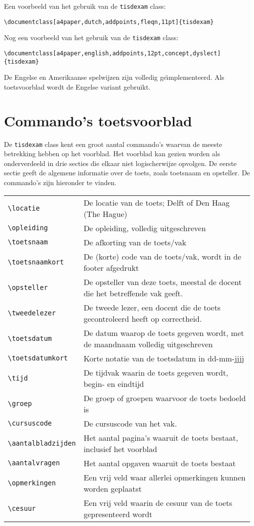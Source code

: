 \documentclass[dutch,a4paper,12pt,addpoints,fleqn,oneside]{tisdexam}
\newcommand\DocClass[1]{\texttt{#1}}
\begin{document}
\bigskip
Een voorbeeld van het gebruik van de \DocClass{tisdexam} class:
\bigskip

\verb|\documentclass[a4paper,dutch,addpoints,fleqn,11pt]{tisdexam}|
\bigskip

Nog een voorbeeld van het gebruik van de \DocClass{tisdexam} class:
\bigskip

\verb|\documentclass[a4paper,english,addpoints,12pt,concept,dyslect]{tisdexam}|
\bigskip

De Engelse en Amerikaanse spelwijzen zijn volledig
ge\"{\i}mplementeerd. Als toetsvoorblad wordt de Engelse variant gebruikt.


\section{Commando's toetsvoorblad}
\label{sec:commands}

De \DocClass{tisdexam} class kent een groot aantal commando's waarvan de meeste
betrekking hebben op het voorblad.  Het voorblad kan gezien worden als onderverdeeld
in drie secties die elkaar niet logischerwijze opvolgen. De eerste sectie geeft de
algemene informatie over de toets, zoals
toetsnaam en opsteller. De commando's zijn hieronder te vinden.
\bigskip

\begin{tabular}{lp{11.9cm}}
\verb|\locatie| & De locatie van de toets; Delft of Den Haag (The Hague) \\
\verb|\opleiding| & De opleiding, volledig uitgeschreven\\ 
\verb|\toetsnaam| & De afkorting van de toets/vak \\
\verb|\toetsnaamkort| & De (korte) code van de toets/vak, wordt in de footer afgedrukt \\ 
\verb|\opsteller| & De opsteller van deze toets, meestal de docent die het betreffende vak geeft. \\
\verb|\tweedelezer| & De tweede lezer, een docent die de toets gecontroleerd heeft op correctheid. \\
\verb|\toetsdatum| & De datum waarop de toets gegeven wordt, met de maandnaam volledig uitgeschreven \\ 
\verb|\toetsdatumkort| & Korte notatie van de toetsdatum in dd-mm-jjjj \\
\verb|\tijd|       & De tijdvak waarin de toets gegeven wordt, begin- en eindtijd \\
\verb|\groep|     & De groep of groepen waarvoor de toets bedoeld is \\ 
\verb|\cursuscode|    & De cursuscode van het vak. \\
\verb|\aantalbladzijden| & Het aantal pagina's waaruit de toets bestaat, inclusief het voorblad \\
\verb|\aantalvragen| & Het aantal opgaven waaruit de toets bestaat \\
\verb|\opmerkingen| & Een vrij veld waar allerlei opmerkingen kunnen worden geplaatst \\
\verb|\cesuur| & Een vrij veld waarin de cesuur van de toets gepresenteerd wordt \\
\end{tabular}
\end{document}
